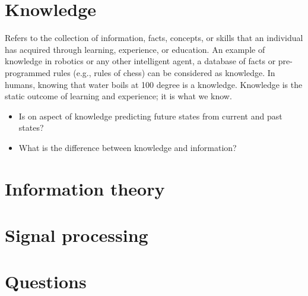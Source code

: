 \section{Knowledge} 
Refers to the collection of information, facts, concepts, or skills that an individual has acquired through learning, experience, or education. An example of knowledge in robotics or any other intelligent agent, a database of facts or pre-programmed rules (e.g., rules of chess) can be considered as knowledge. In humans, knowing that water boils at 100 degree is a knowledge. Knowledge is the static outcome of learning and experience; it is what we know. 
        \begin{itemize}
            \item Is on aspect of knowledge predicting future states from current and past states?
            \item What is the difference between knowledge and information?
        \end{itemize}

        
\section{Information theory}

\section{Signal processing}

\section{Questions}


